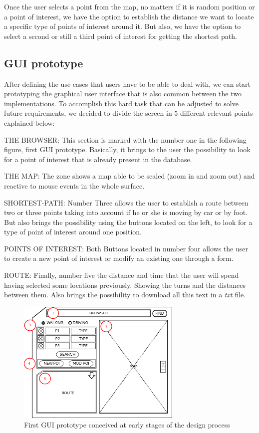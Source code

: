 \documentclass{article}
\begin{document}
Once the user selects a point from the map, no matters if it is random position or a point of interest, we have the option to establish the distance we want to locate a specific type of points of interest around it. But also, we have the option to select a second or still a third point of interest for getting the shortest path.

\subsection{GUI prototype}
After defining the use cases that users have to be able to deal with, we can start prototyping the graphical user interface that is also common between the two implementations. To accomplish this hard task that can be adjusted to solve future requirements, we decided to divide the screen in 5 different relevant points explained below:

THE BROWSER: This section is marked with the number one in the following figure, first GUI prototype. Basically, it brings to the user the possibility to look for a point of interest that is already present in the database.

THE MAP: The zone shows a map able to be scaled (zoom in and zoom out) and reactive to mouse events in the whole surface.

SHORTEST-PATH: Number Three allows the user to establish a route between two or three points taking into account if he or she is moving by car or by foot. But also brings the possibility using the buttons located on the left, to look for a type of point of interest around one position.

POINTS OF INTEREST: Both Buttons located in number four allows the user to create a new point of interest or modify an existing one through a form.

ROUTE: Finally, number five the distance and time that the user will spend having selected some locations previously. Showing the turns and the distances between them. Also brings the possibility to download all this text in a \textit{txt} file.

\begin{figure}[h]
\centering
\includegraphics[width=0.7\textwidth]{Prototype.png}
\caption{First GUI prototype conceived at early stages of the design process}
\end{figure}
\end{document}
